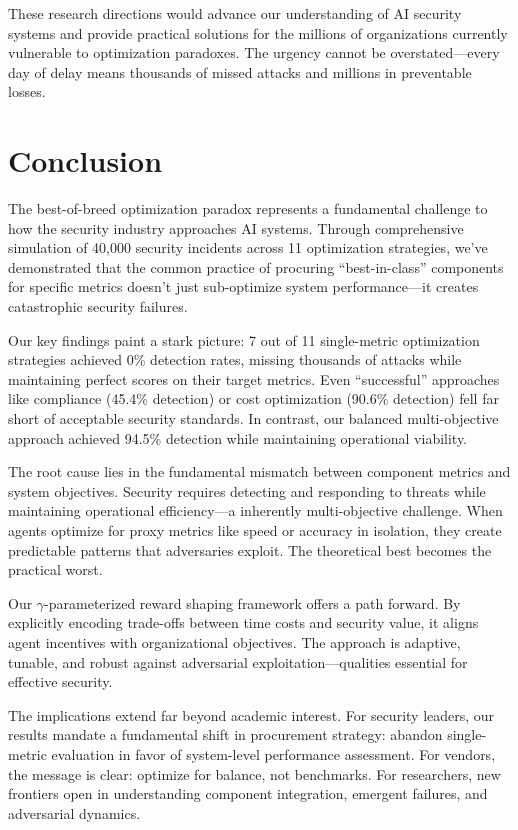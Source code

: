 \documentclass[10pt,conference]{IEEEtran}
\begin{document}
These research directions would advance our understanding of AI security systems and provide practical solutions for the millions of organizations currently vulnerable to optimization paradoxes. The urgency cannot be overstated---every day of delay means thousands of missed attacks and millions in preventable losses.

\section{Conclusion}

The best-of-breed optimization paradox represents a fundamental challenge to how the security industry approaches AI systems. Through comprehensive simulation of 40,000 security incidents across 11 optimization strategies, we've demonstrated that the common practice of procuring ``best-in-class'' components for specific metrics doesn't just sub-optimize system performance---it creates catastrophic security failures.

Our key findings paint a stark picture: 7 out of 11 single-metric optimization strategies achieved 0\% detection rates, missing thousands of attacks while maintaining perfect scores on their target metrics. Even ``successful'' approaches like compliance (45.4\% detection) or cost optimization (90.6\% detection) fell far short of acceptable security standards. In contrast, our balanced multi-objective approach achieved 94.5\% detection while maintaining operational viability.

The root cause lies in the fundamental mismatch between component metrics and system objectives. Security requires detecting and responding to threats while maintaining operational efficiency---a inherently multi-objective challenge. When agents optimize for proxy metrics like speed or accuracy in isolation, they create predictable patterns that adversaries exploit. The theoretical best becomes the practical worst.

Our $\gamma$-parameterized reward shaping framework offers a path forward. By explicitly encoding trade-offs between time costs and security value, it aligns agent incentives with organizational objectives. The approach is adaptive, tunable, and robust against adversarial exploitation---qualities essential for effective security.

The implications extend far beyond academic interest. For security leaders, our results mandate a fundamental shift in procurement strategy: abandon single-metric evaluation in favor of system-level performance assessment. For vendors, the message is clear: optimize for balance, not benchmarks. For researchers, new frontiers open in understanding component integration, emergent failures, and adversarial dynamics.
\end{document}
